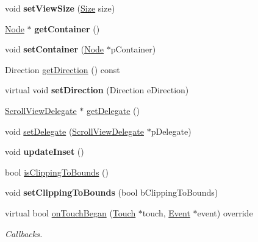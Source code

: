 \begin{DoxyCompactItemize}
\item 
\mbox{\label{classScrollView_af4e7c57f46b1654ecb64bfeba9979275}} 
void {\bfseries set\+View\+Size} (\hyperlink{classSize}{Size} size)
\item 
\mbox{\label{classScrollView_ae5d014a4d0fa32c2b5f2f5d3589ce606}} 
\hyperlink{classNode}{Node} $\ast$ {\bfseries get\+Container} ()
\item 
\mbox{\label{classScrollView_a1379d2b9cd15a386f4c97f179d748dde}} 
void {\bfseries set\+Container} (\hyperlink{classNode}{Node} $\ast$p\+Container)
\item 
Direction \hyperlink{classScrollView_a29b46de3ff7003160ddb9b51f38e64c1}{get\+Direction} () const
\item 
\mbox{\label{classScrollView_acf607cfec58d1f0565178272b2b102b6}} 
virtual void {\bfseries set\+Direction} (Direction e\+Direction)
\item 
\hyperlink{classScrollViewDelegate}{Scroll\+View\+Delegate} $\ast$ \hyperlink{classScrollView_a49b7e183c04e572d20f20ac4d8a6d3c6}{get\+Delegate} ()
\item 
void \hyperlink{classScrollView_a450371726a685f72266384598630439c}{set\+Delegate} (\hyperlink{classScrollViewDelegate}{Scroll\+View\+Delegate} $\ast$p\+Delegate)
\item 
\mbox{\label{classScrollView_a0d2e0d1f2fcd7587a0bb45e1e142bc84}} 
void {\bfseries update\+Inset} ()
\item 
bool \hyperlink{classScrollView_a7c5e4247b97f795d120e68b1fbee751e}{is\+Clipping\+To\+Bounds} ()
\item 
\mbox{\label{classScrollView_aacdda6e1da63c3fd215e458e5e3e1b9a}} 
void {\bfseries set\+Clipping\+To\+Bounds} (bool b\+Clipping\+To\+Bounds)
\item 
virtual bool \hyperlink{classScrollView_a18daa7ba9b5f802e65a6df2dde10a625}{on\+Touch\+Began} (\hyperlink{classTouch}{Touch} $\ast$touch, \hyperlink{classEvent}{Event} $\ast$event) override
\begin{DoxyCompactList}\small\item\em Callbacks. \end{DoxyCompactList}\item 

\end{DoxyCompactItemize}
